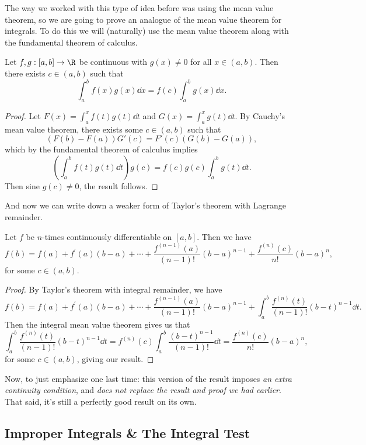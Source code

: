 The way we worked with this type of idea before was using the mean value theorem, so we are going to prove an analogue of the mean value theorem for integrals. To do this we will (naturally) use the mean value theorem along with the fundamental theorem of calculus.


\begin{lemma}
	Let $f, g : [a, b] \rightarrow \R$ be continuous with $g(x) \neq 0$ for all $x \in (a, b)$. Then there exists $c \in (a, b)$ such that
	$$
	\int_a^b f(x) g(x) \dd x = f(c) \int_a^b g(x) \dd x.
	$$
\end{lemma}
\begin{proof}
	Let $F(x) = \int_a^x f(t) g(t) \dd t$ and $G(x) = \int_a^x g(t) \dd t$.
	By Cauchy's mean value theorem, there exists some $c \in (a, b)$ such that
	$$
	(F(b) - F(a))G'(c) = F'(c)(G(b) - G(a)),
	$$
	which by the fundamental theorem of calculus implies
	$$
	\left(\int_a^b f(t) g(t) \dd t\right)g(c) = f(c) g(c) \int_a^b g(t) \dd t.
	$$
	Then sine $g(c) \neq 0$, the result follows.
\end{proof}


And now we can write down a weaker form of Taylor's theorem with Lagrange remainder.

\begin{theorem}
	Let $f$ be $n$-times continuously differentiable on $[a, b]$. Then we have
	$$
	f(b)=f(a)+f^{\prime}(a)(b-a)+\cdots+\frac{f^{(n-1)}(a)}{(n-1) !}(b-a)^{n-1}+\frac{f^{(n)}(c)}{n !}(b-a)^{n},
	$$
	for some $c \in (a, b)$.
\end{theorem}
\begin{proof}
	By Taylor's theorem with integral remainder, we have
	$$
	f(b)=f(a)+f^{\prime}(a)(b-a)+\cdots+\frac{f^{(n-1)}(a)}{(n-1) !}(b-a)^{n-1}+\int_{a}^{b} \frac{f^{(n)}(t)}{(n-1) !}(b-t)^{n-1} \dd t.
	$$
	Then the integral mean value theorem gives us that
	$$
	\int_{a}^{b} \frac{f^{(n)}(t)}{(n-1) !}(b-t)^{n-1} \dd t = f^{(n)}(c) \int_{a}^{b} \frac{(b-t)^{n-1}}{(n-1) !} \dd t = \frac{f^{(n)}(c)}{n!}(b - a)^n, 
	$$
	for some $c \in (a, b)$, giving our result.
\end{proof}

Now, to just emphasize one last time: this version of the result imposes \emph{an extra continuity condition}, and \emph{does not replace the result and proof we had earlier}. That said, it's still a perfectly good result on its own.

\subsection{Improper Integrals \& The Integral Test}

